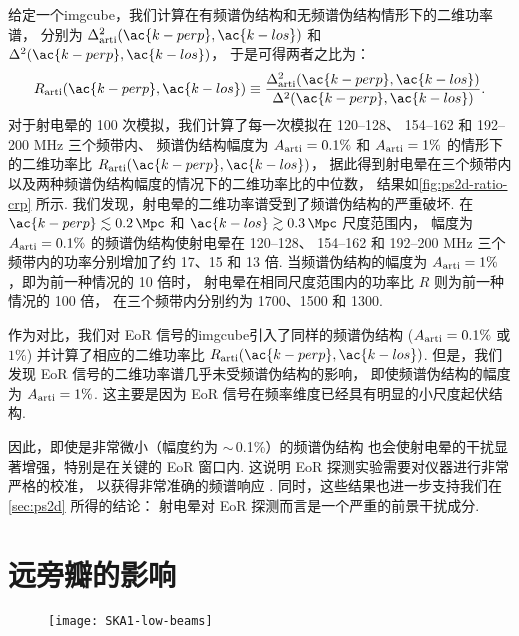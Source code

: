 给定一个\ac{imgcube}，我们计算在有频谱伪结构和无频谱伪结构情形下的二维功率谱，
分别为 $\Delta^2_{\R{arti}}(\ac{k-perp}, \ac{k-los})$ 
和 $\Delta^2(\ac{k-perp}, \ac{k-los})$，
于是可得两者之比为：
\begin{equation}
  R_{\R{arti}}(\ac{k-perp}, \ac{k-los})
    \equiv \frac{\Delta^2_{\R{arti}}(\ac{k-perp}, \ac{k-los})}{
      \Delta^2(\ac{k-perp}, \ac{k-los})} .
\end{equation}
对于射电晕的 100 次模拟，我们计算了每一次模拟在 \numrange{120}{128}、
\numrange{154}{162} 和 \numrange{192}{200} \si{\MHz} 三个频带内、
频谱伪结构幅度为 $A_{\mathrm{arti}} = 0.1\%$ 和 $A_{\mathrm{arti}} = 1\%$
的情形下的二维功率比 $R_{\R{arti}}(\ac{k-perp}, \ac{k-los})$，
据此得到射电晕在三个频带内以及两种频谱伪结构幅度的情况下的二维功率比的中位数，
结果如\autoref{fig:ps2d-ratio-crp} 所示.
我们发现，射电晕的二维功率谱受到了频谱伪结构的严重破坏.
在 $\ac{k-perp} \lesssim \SI{0.2}{\per\Mpc}$ 和
$\ac{k-los} \gtrsim \SI{0.3}{\per\Mpc}$ 尺度范围内，
幅度为 $A_{\mathrm{arti}} = 0.1\%$ 的频谱伪结构使射电晕在 \numrange{120}{128}、
\numrange{154}{162} 和 \numrange{192}{200} \si{\MHz}
三个频带内的功率分别增加了约 17、15 和 13 倍.
当频谱伪结构的幅度为 $A_{\mathrm{arti}} = 1\%$，即为前一种情况的 10 倍时，
射电晕在相同尺度范围内的功率比 $R$ 则为前一种情况的 100 倍，
在三个频带内分别约为 1700、1500 和 1300.

作为对比，我们对 EoR 信号的\ac{imgcube}引入了同样的频谱伪结构
($A_{\mathrm{arti}} = 0.1\%$ 或 $1\%$)
并计算了相应的二维功率比 $R_{\R{arti}}(\ac{k-perp}, \ac{k-los})$.
但是，我们发现 EoR 信号的二维功率谱几乎未受频谱伪结构的影响，
即使频谱伪结构的幅度为 $A_{\mathrm{arti}} = 1\%$.
这主要是因为 EoR 信号在频率维度已经具有明显的小尺度起伏结构.

因此，即使是非常微小（幅度约为 $\sim$\,0.1\%）的频谱伪结构
也会使射电晕的干扰显著增强，特别是在关键的 EoR 窗口内.
这说明 EoR 探测实验需要对仪器进行非常严格的校准，
以获得非常准确的频谱响应 \cite{barry2016}.
同时，这些结果也进一步支持我们在 \autoref{sec:ps2d} 所得的结论：
射电晕对 EoR 探测而言是一个严重的前景干扰成分.


\section{远旁瓣的影响}
\label{sec:fscn}

\begin{figure}[htp]
  \centering
  \texttt{[image: SKA1-low-beams]}
  \label{fig:ska-beams}
\end{figure}

